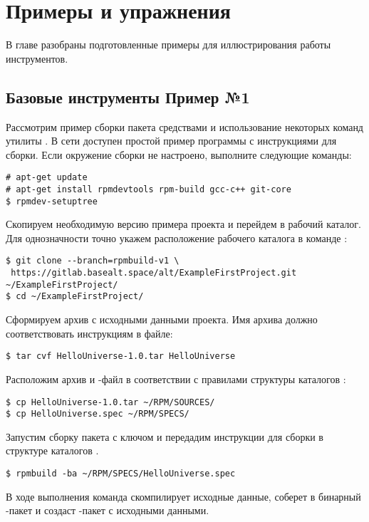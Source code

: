 \chapter{Примеры и упражнения}

В главе разобраны подготовленные примеры для иллюстрирования работы инструментов.

\section{Базовые инструменты  \textbf{Пример №1}}

Рассмотрим пример сборки пакета средствами  и использование
некоторых команд утилиты . В сети доступен простой пример 
программы с инструкциями для сборки.
Если окружение сборки  не настроено, выполните следующие команды:
\begin{verbatim}
# apt-get update
# apt-get install rpmdevtools rpm-build gcc-c++ git-core
$ rpmdev-setuptree
\end{verbatim}

Скопируем необходимую версию примера проекта и перейдем
в рабочий каталог. Для однозначности точно укажем расположение рабочего
каталога  в команде :
\begin{verbatim}
$ git clone --branch=rpmbuild-v1 \
 https://gitlab.basealt.space/alt/ExampleFirstProject.git ~/ExampleFirstProject/
$ cd ~/ExampleFirstProject/
\end{verbatim}

Сформируем  архив с исходными данными проекта. Имя архива должно
соответствовать инструкциям в \Sys{.spec} файле:
\begin{verbatim}
$ tar cvf HelloUniverse-1.0.tar HelloUniverse
\end{verbatim}

Расположим архив и -файл в соответствии с правилами структуры каталогов
\Sys{RPM}:
\begin{verbatim}
$ cp HelloUniverse-1.0.tar ~/RPM/SOURCES/
$ cp HelloUniverse.spec ~/RPM/SPECS/
\end{verbatim}

Запустим сборку пакета с ключом  и передадим инструкции для сборки
в структуре каталогов \Sys{RPM}.
\begin{verbatim}
$ rpmbuild -ba ~/RPM/SPECS/HelloUniverse.spec
\end{verbatim}

В ходе выполнения команда скомпилирует исходные данные, соберет
в бинарный -пакет и создаст -пакет с исходными данными.

